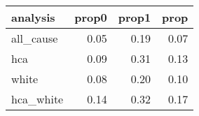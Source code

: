 \begin{table}[ht]
\centering
\begingroup\footnotesize
\begin{tabular}{lrrr}
  \hline
analysis & prop0 & prop1 & prop \\ 
  \hline
all\_cause & 0.05 & 0.19 & 0.07 \\ 
  hca & 0.09 & 0.31 & 0.13 \\ 
  white & 0.08 & 0.20 & 0.10 \\ 
  hca\_white & 0.14 & 0.32 & 0.17 \\ 
   \hline
\end{tabular}
\endgroup
\caption{} 
\end{table}

